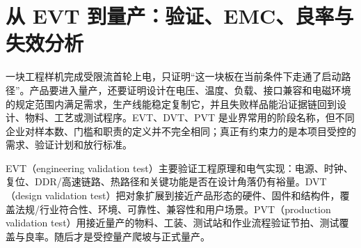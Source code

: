 \section{从 EVT 到量产：验证、EMC、良率与失效分析}

一块工程样机完成受限流首轮上电，只证明“这一块板在当前条件下走通了启动路径”。产品要进入量产，还要证明设计在电压、温度、负载、接口兼容和电磁环境的规定范围内满足需求，生产线能稳定复制它，并且失败样品能沿证据链回到设计、物料、工艺或测试程序。EVT、DVT、PVT 是业界常用的阶段名称，但不同企业对样本数、门槛和职责的定义并不完全相同；真正有约束力的是本项目受控的需求、验证计划和放行标准。


EVT（engineering validation test）主要验证工程原理和电气实现：电源、时钟、复位、DDR/高速链路、热路径和关键功能是否在设计角落仍有裕量。DVT（design validation test）把对象扩展到接近产品形态的硬件、固件和结构件，覆盖法规/行业符合性、环境、可靠性、兼容性和用户场景。PVT（production validation test）用接近量产的物料、工装、测试站和作业流程验证节拍、测试覆盖与良率。随后才是受控量产爬坡与正式量产。

